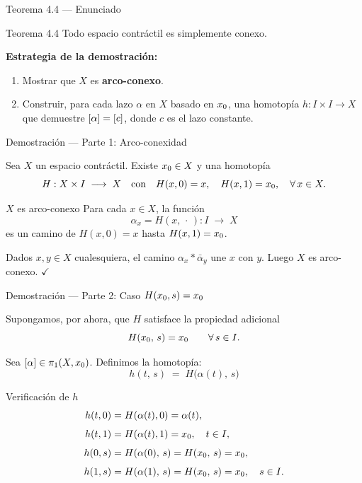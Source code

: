 \begin{frame}{Teorema 4.4 — Enunciado}

  \begin{block}{Teorema 4.4}
    Todo espacio contráctil es simplemente conexo.
  \end{block}

  \bigskip
  \textbf{Estrategia de la demostración:}
  \begin{enumerate}
    \item Mostrar que $X$ es \textbf{arco-conexo}.
    \item Construir, para cada lazo $\alpha$ en $X$ basado en $x_0$,
          una homotopía $h : I \times I \to X$ que demuestre
          $[\alpha] = [c]$, donde $c$ es el lazo constante.
  \end{enumerate}

\end{frame}

\begin{frame}{Demostración — Parte 1: Arco-conexidad}

  Sea $X$ un espacio contráctil. Existe $x_0 \in X$ y una homotopía
  \[
    H : X \times I \;\longrightarrow\; X
    \quad \text{con} \quad
    H(x,0) = x, \quad H(x,1) = x_0, \quad \forall\, x \in X.
  \]

  \medskip
  \begin{block}{$X$ es arco-conexo}
    Para cada $x \in X$, la función
    \[
      \alpha_x = H(x,\,\cdot\,) : I \;\longrightarrow\; X
    \]
    es un camino de $H(x,0) = x$ hasta $H(x,1) = x_0$.

    \medskip
    Dados $x, y \in X$ cualesquiera, el camino
    $\alpha_x * \bar{\alpha}_y$ une $x$ con $y$.
    Luego $X$ es arco-conexo. \hfill $\checkmark$
  \end{block}

\end{frame}

\begin{frame}{Demostración — Parte 2: Caso $H(x_0, s) = x_0$}

  Supongamos, por ahora, que $H$ satisface la propiedad adicional
  \[
    H(x_0,\, s) = x_0 \qquad \forall\, s \in I.
  \]

  \medskip
  Sea $[\alpha] \in \pi_1(X, x_0)$.
  Definimos la homotopía:
  \[
    \boxed{h(t,\, s) \;=\; H\!\bigl(\alpha(t),\, s\bigr)}
  \]

  \begin{exampleblock}{Verificación de $h$}
    \begin{align*}
      h(t,0) &= H(\alpha(t), 0) = \alpha(t), \\[4pt]
      h(t,1) &= H(\alpha(t), 1) = x_0, \quad t \in I, \\[4pt]
      h(0,s) &= H(\alpha(0),\, s) = H(x_0,\, s) = x_0, \\[4pt]
      h(1,s) &= H(\alpha(1),\, s) = H(x_0,\, s) = x_0, \quad s \in I.
    \end{align*}
  \end{exampleblock}

\end{frame}

